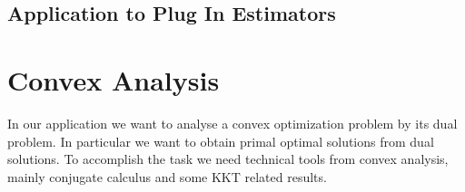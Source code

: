 \documentclass[11pt, a4paper, BCOR=10mm, DIV=11]{scrbook}
\theoremstyle{definition}
\theoremstyle{plain}
\begin{document}
  \section{Application to Plug In Estimators}
  
%
%  
%  
%
%  

\chapter{Convex Analysis}
In our application we want to analyse a convex optimization problem by its dual problem.
In particular we want to obtain primal optimal solutions from dual solutions.
To accomplish the task we need technical tools from convex analysis, 
mainly conjugate calculus and some KKT related results.
\end{document}
